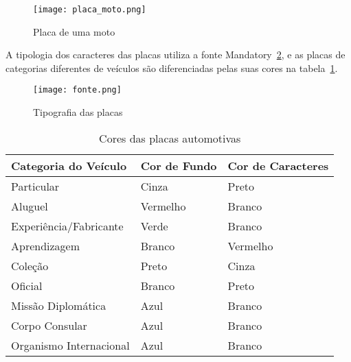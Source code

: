 \begin{figure}[H]
		\centering
		\texttt{[image: placa\_moto.png]}
		\caption{Placa de uma moto}
		\label{fig:placa_moto}
\end{figure}

A tipologia dos caracteres das placas utiliza a fonte
Mandatory~\ref{fig:tipografia}, e as placas de categorias diferentes de veículos
são diferenciadas pelas suas cores na tabela~\ref{tab:placa_cores}.

\begin{figure}[H]
		\centering
		\texttt{[image: fonte.png]}
		\caption{Tipografia das placas}
		\label{fig:tipografia}
\end{figure}

\begin{table}[]
\centering
\label{tab:placa_cores}
\caption{Cores das placas automotivas}
\begin{tabular}{|l|l|l|}
\hline
\textbf{Categoria do Veículo}                                               & \textbf{Cor de Fundo} & \textbf{Cor de Caracteres} \\ \hline
Particular                                                                  & Cinza                 & Preto                      \\ \hline
Aluguel                                                                     & Vermelho              & Branco                     \\ \hline
Experiência/Fabricante                                                      & Verde                 & Branco                     \\ \hline
Aprendizagem                                                                & Branco                & Vermelho                   \\ \hline
Coleção                                                                     & Preto                 & Cinza                      \\ \hline
Oficial                                                                     & Branco                & Preto                      \\ \hline
Missão Diplomática                                                          & Azul                  & Branco                     \\ \hline
Corpo Consular                                                              & Azul                  & Branco                     \\ \hline
Organismo Internacional                                                     & Azul                  & Branco                     \\ \hline

\end{tabular}
\end{table}
